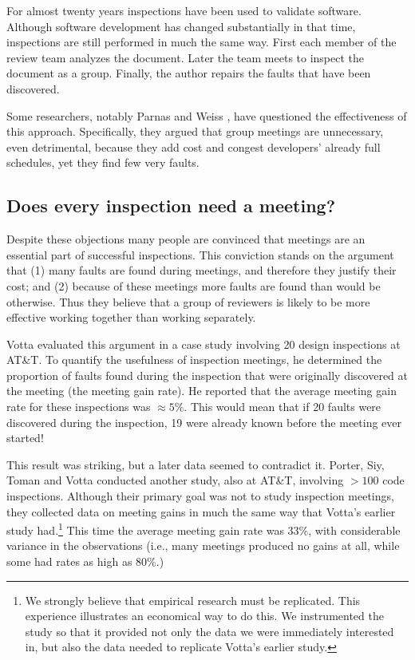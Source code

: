 For almost twenty years inspections have been used to validate software.
Although software development has changed substantially in that time,
inspections are still performed in much the same way. 
First each member of the review team 
analyzes the document. Later the team meets to inspect the document as 
a group. Finally, the author repairs the faults that have been discovered.

Some researchers, notably Parnas and Weiss \cite{parnas.1985}, have questioned the 
effectiveness of this approach. Specifically, they argued that group
meetings are unnecessary, even detrimental, because 
they add cost and congest developers' already full schedules, yet 
they find few very faults.

\subsection{Does every inspection need a meeting?}

Despite these objections many people are convinced that meetings
are an essential part of successful inspections. This conviction
stands on the argument that (1) many faults are found during meetings,
and therefore they justify their cost; and (2) because of these meetings
more faults are found than would be otherwise. Thus they believe that
a group of reviewers is likely to be more effective working together than
working separately.

Votta \cite{votta.1993} evaluated this argument in a case study involving 20 design 
inspections at AT\&T. To quantify the usefulness of inspection meetings, he
determined the proportion of faults found during the inspection
that were originally discovered at the meeting (the meeting gain rate).
He reported that the average meeting gain rate for these inspections was
$\approx 5\%$. This would mean that if 20 faults were discovered during the 
inspection, 19 were already known before the meeting ever started!

This result was striking, but a later data seemed to contradict it.
Porter, Siy, Toman and Votta \cite{PSTV:Live} conducted another study, also at AT\&T, 
involving $> 100 $ code inspections. Although their primary goal 
was not to study inspection meetings, they collected data 
on meeting gains in much the same way that Votta's earlier study had.\footnote{
We strongly believe that empirical research must be replicated. This
experience illustrates an economical way to do this. We instrumented the study 
so that it provided not only the data we were immediately interested in, but
also the data needed to replicate Votta's earlier study.}
This time the average meeting gain rate was 33\%, with considerable variance
in the observations (i.e., many meetings produced no gains at all,
while some had rates as high as 80\%.)

